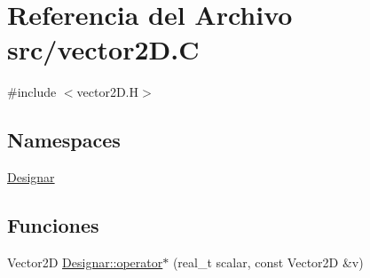 \hypertarget{vector2_d_8_c}{}\section{Referencia del Archivo src/vector2D.C}
\label{vector2_d_8_c}
{\ttfamily \#include $<$vector2\+D.\+H$>$}\newline
\subsection*{Namespaces}
\begin{DoxyCompactItemize}
\item 
 \hyperlink{namespace_designar}{Designar}
\end{DoxyCompactItemize}
\subsection*{Funciones}
\begin{DoxyCompactItemize}
\item 
Vector2D \hyperlink{namespace_designar_a4b2db2e125d6ac9edf439f63804ba674}{Designar\+::operator$\ast$} (real\+\_\+t scalar, const Vector2D \&v)
\end{DoxyCompactItemize}
